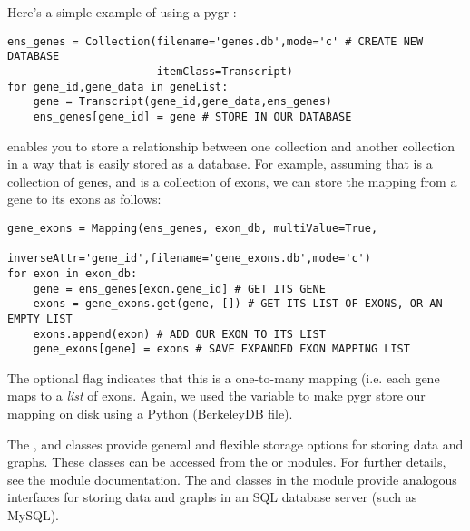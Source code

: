 \documentclass{howto}
\begin{document}
Here's a simple example of using a pygr :
\begin{verbatim}
ens_genes = Collection(filename='genes.db',mode='c' # CREATE NEW DATABASE
                       itemClass=Transcript)
for gene_id,gene_data in geneList:
    gene = Transcript(gene_id,gene_data,ens_genes)
    ens_genes[gene_id] = gene # STORE IN OUR DATABASE
\end{verbatim}

 enables you to store a relationship between one collection
and another collection in a way that is easily stored as a database.  For
example, assuming that  is a collection of genes,
and  is a collection of exons, we can store the mapping from
a gene to its exons as follows:

\begin{verbatim}
gene_exons = Mapping(ens_genes, exon_db, multiValue=True, 
                     inverseAttr='gene_id',filename='gene_exons.db',mode='c')
for exon in exon_db:
    gene = ens_genes[exon.gene_id] # GET ITS GENE
    exons = gene_exons.get(gene, []) # GET ITS LIST OF EXONS, OR AN EMPTY LIST
    exons.append(exon) # ADD OUR EXON TO ITS LIST
    gene_exons[gene] = exons # SAVE EXPANDED EXON MAPPING LIST
\end{verbatim}
The optional  flag indicates that this is a one-to-many
mapping (i.e. each gene maps to a {\em list} of exons.  Again, we used the 
 variable to make pygr store our mapping on disk using a Python
 (BerkeleyDB file).

The ,  and  classes provide
general and flexible storage options for storing data and graphs.  These classes
can be accessed from the  or  modules.
For further details, see the  module documentation.
The  and  classes in the 
module provide analogous interfaces for storing data and graphs in an SQL
database server (such as MySQL).
\end{document}
